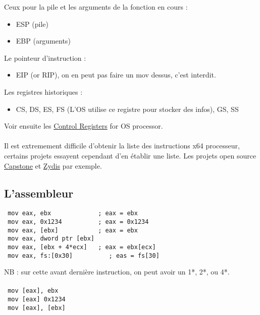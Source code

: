 \documentclass[a4paper,10pt]{article}
\begin{document}
Ceux pour la pile et les arguments de la fonction en cours : 
\begin{itemize}
 \item ESP (pile)
 \item EBP (arguments)
\end{itemize}

Le pointeur d'instruction : 
\begin{itemize}
 \item EIP (or RIP), on en peut pas faire un mov dessus, c'est interdit.
\end{itemize}

Les registres historiques : 
\begin{itemize}
 \item CS, DS, ES, FS (L'OS utilise ce registre pour stocker des infos), GS, SS
\end{itemize}

Voir ensuite les \href{https://en.wikipedia.org/wiki/Control_register}{Control Registers}	for OS processor.

\paragraph*{}
Il est extremement difficile d'obtenir la liste des instructions x64 processeur, certains projets essayent cependant d'en établir une liste. Les projets open source \href{http://www.capstone-engine.org/}{Capstone} et \href{https://github.com/zyantific/zydis}{Zydis} par exemple.

\subsection{L'assembleur}
\begin{lstlisting}
 mov eax, ebx             ; eax = ebx
 mov eax, 0x1234          ; eax = 0x1234
 mov eax, [ebx]           ; eax = ebx
 mov eax, dword ptr [ebx]
 mov eax, [ebx + 4*ecx]   ; eax = ebx[ecx]
 mov eax, fs:[0x30]          ; eas = fs[30]
\end{lstlisting}
NB : sur cette avant dernière instruction, on peut avoir un 1*, 2*, ou 4*.

\paragraph*{}
\begin{lstlisting}
 mov [eax], ebx
 mov [eax] 0x1234
 mov [eax], [ebx]
\end{lstlisting}
\end{document}
